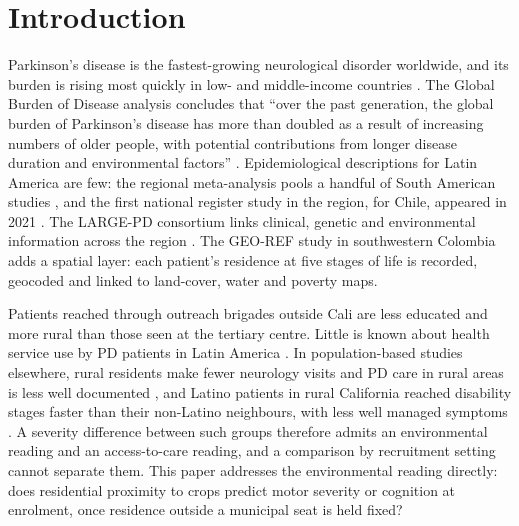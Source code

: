 \documentclass[11pt,a4paper]{article}
\begin{document}
\begin{abstract}
\textbf{Conclusions.} On the patients' own account, living near crops is not associated with motor severity or cognition at enrolment. Effects of the survey proxy larger than about five MDS-UPDRS III points are unlikely; smaller effects are not excluded, and recall error biases the estimate toward zero. Residence outside a municipal seat and mapped proximity to cultivated land both go with a worse motor examination, and the data cannot say whether that is ambient exposure or rural disadvantage. Street-level geocoding of every residence and a direct measure of travel time to care are needed to separate the two.

\medskip\noindent\textbf{Keywords:} Parkinson's disease; pesticides; residential proximity; Colombia; LARGE-PD; land cover
\end{abstract}

\section{Introduction}

Parkinson's disease is the fastest-growing neurological disorder worldwide, and its burden is rising most quickly in low- and middle-income countries \citep{dorsey_global_2018,pringsheim_prevalence_2014}. The Global Burden of Disease analysis concludes that ``over the past generation, the global burden of Parkinson's disease has more than doubled as a result of increasing numbers of older people, with potential contributions from longer disease duration and environmental factors'' \citep{dorsey_global_2018}. Epidemiological descriptions for Latin America are few: the regional meta-analysis pools a handful of South American studies \citep{pringsheim_prevalence_2014}, and the first national register study in the region, for Chile, appeared in 2021 \citep{vial_epidemiology_2021}. The LARGE-PD consortium links clinical, genetic and environmental information across the region \citep{zabetian_large_2017}. The GEO-REF study in southwestern Colombia adds a spatial layer: each patient's residence at five stages of life is recorded, geocoded and linked to land-cover, water and poverty maps.

Patients reached through outreach brigades outside Cali are less educated and more rural than those seen at the tertiary centre. Little is known about health service use by PD patients in Latin America \citep{kim_burden_2023}. In population-based studies elsewhere, rural residents make fewer neurology visits \citep{crighton_patterns_2024} and PD care in rural areas is less well documented \citep{fealy_exploring_2023}, and Latino patients in rural California reached disability stages faster than their non-Latino neighbours, with less well managed symptoms \citep{duarte_folle_ethnicity_2023}. A severity difference between such groups therefore admits an environmental reading and an access-to-care reading, and a comparison by recruitment setting cannot separate them. This paper addresses the environmental reading directly: does residential proximity to crops predict motor severity or cognition at enrolment, once residence outside a municipal seat is held fixed?
\end{document}

